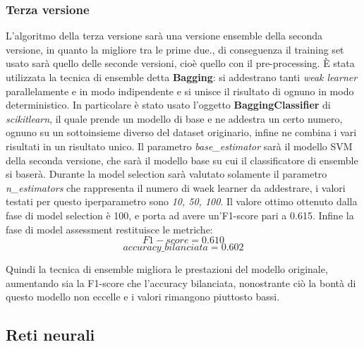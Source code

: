 \subsubsection{Terza versione}\label{subsubsec:svmv3}
L'algoritmo della terza versione sarà una versione ensemble della seconda versione, in quanto la migliore tra le prime due., di conseguenza il training set usato sarà quello delle seconde versioni, cioè quello con il pre-processing. È stata utilizzata la tecnica di ensemble detta \textbf{Bagging}: si addestrano tanti \textit{weak learner} parallelamente e in modo indipendente e si unisce il risultato di ognuno in modo deterministico. In particolare è stato usato l'oggetto \textbf{BaggingClassifier} di \textit{scikitlearn}, il quale prende un modello di base e ne addestra un certo numero, ognuno su un sottoinsieme diverso del dataset originario, infine ne combina i vari risultati in un risultato unico. Il parametro \textit{base\_estimator} sarà il modello SVM della seconda versione, che sarà il modello base su cui il classificatore di ensemble si baserà. Durante la model selection sarà valutato solamente il parametro \textit{n\_estimators} che rappresenta il numero di waek learner da addestrare, i valori testati per questo iperparametro sono \textit{10, 50, 100}. Il valore ottimo ottenuto dalla fase di model selection è 100, e porta ad avere un'F1-score pari a 0.615. Infine la fase di model assessment restituisce le metriche:
$$F1-score = 0.610$$
$$accuracy\_bilanciata = 0.602$$

Quindi la tecnica di ensemble migliora le prestazioni del modello originale, aumentando sia la F1-score che l'accuracy bilanciata, nonostrante ciò la bontà di questo modello non eccelle e i valori rimangono piuttosto bassi.

\subsection{Reti neurali}
